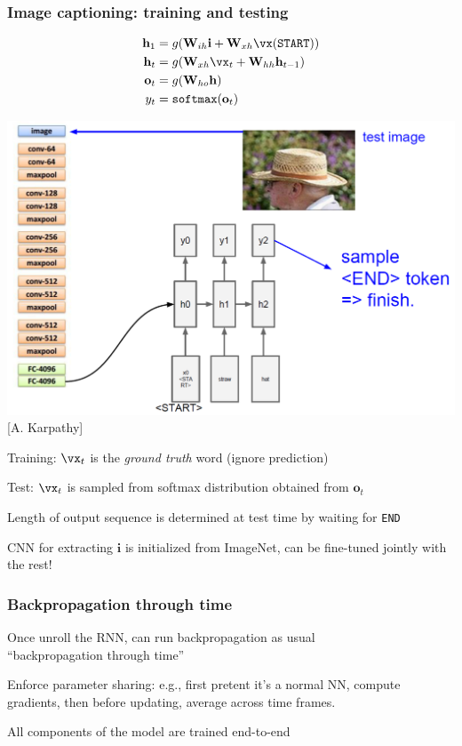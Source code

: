 \documentclass[xcolor=dvipsnames]{beamer}
\begin{document}
\begin{frame}
  \frametitle{Image captioning: training and testing}
  \begin{minipage}[c]{.5\linewidth}
     \begin{align*}
    \mathbf{h}_1&=g(\mathbf{W}_{ih}\mathbf{i}+\mathbf{W}_{xh}\vx(\texttt{START}))\\
    \mathbf{h}_t&=g(\mathbf{W}_{xh}\vx_t+\mathbf{W}_{hh}\mathbf{h}_{t-1})\\
    \mathbf{o}_t&=g(\mathbf{W}_{ho}\mathbf{h})\\
    y_t&=\texttt{softmax}(\mathbf{o}_t)
  \end{align*}
  \end{minipage}%
  \begin{minipage}[c]{.5\linewidth}
      \includegraphics[width=.99\textwidth]{ak-imagecaption-run}\\
      {[A. Karpathy]}
  \end{minipage}
\bi
\item Training: $\vx_t$ is the \emph{ground truth} word (ignore
  prediction)
\item Test: $\vx_t$ is sampled from softmax distribution obtained from
  $\mathbf{o}_t$
\item Length of output sequence is determined at test time by waiting
  for {\tt END}
\item CNN for extracting $\mathbf{i}$ is initialized from ImageNet,
  can be fine-tuned jointly with the rest!
\ei
\end{frame}

\begin{frame}
  \frametitle{Backpropagation through time}
  \bi
\item Once unroll the RNN, can run backpropagation as usual\\
``backpropagation through time''
\item Enforce parameter sharing: e.g., first pretent it's a normal NN,
  compute gradients, then before updating, average across time frames.
\item All components of the model are trained end-to-end
\ei
\end{frame}
\end{document}
